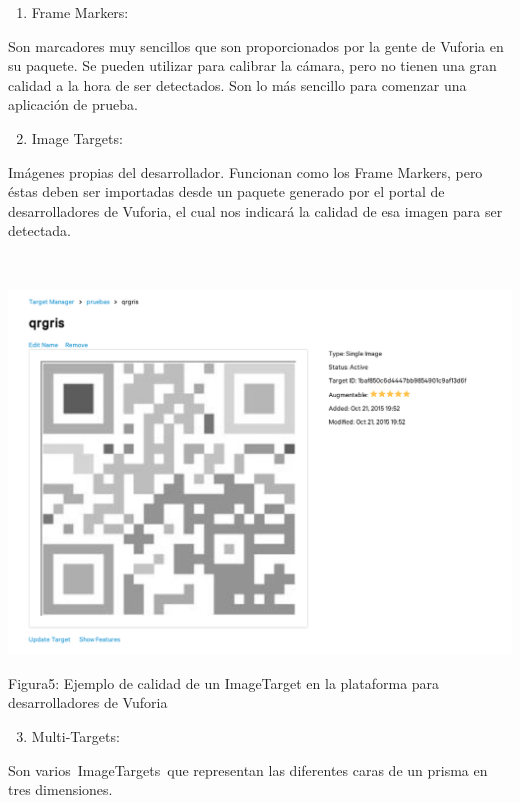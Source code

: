 \documentclass[]{article}
\begin{document}
\begin{enumerate}
\itemsep1pt\parskip0pt
\item
  Frame Markers:
\end{enumerate}

Son marcadores muy sencillos que son proporcionados por la gente de
Vuforia en su paquete. Se pueden utilizar para calibrar la cámara, pero
no tienen una gran calidad a la hora de ser detectados. Son lo más
sencillo para comenzar una aplicación de prueba.

\begin{enumerate}
\setcounter{enumi}{1}
\itemsep1pt\parskip0pt
\item
  Image Targets:
\end{enumerate}

Imágenes propias del desarrollador. Funcionan como los Frame Markers,
pero éstas deben ser importadas desde un paquete generado por el portal
de desarrolladores de Vuforia, el cual nos indicará la calidad de esa
imagen para ser detectada.

~~~~~~~~~~~~~~~~~ ~~~~~~~~~~~~~~~~~

\includegraphics{images/image11.png}

Figura5: Ejemplo de calidad de un ImageTarget en la plataforma para
desarrolladores de Vuforia

\begin{enumerate}
\setcounter{enumi}{2}
\itemsep1pt\parskip0pt
\item
  Multi-Targets:
\end{enumerate}

Son varios~ImageTargets~que representan las diferentes caras de un
prisma en tres dimensiones.
\end{document}
